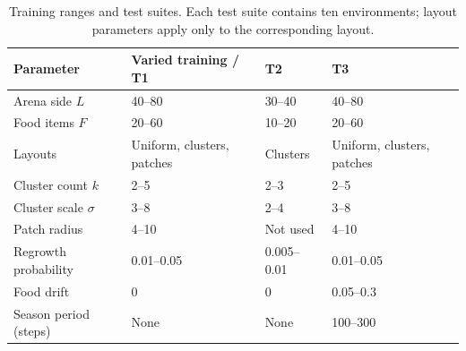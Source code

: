 \begin{table}[tb]
\centering\small
\caption{Training ranges and test suites. Each test suite contains ten environments; layout parameters apply only to the corresponding layout.}\label{tab:env}
\begin{tabularx}{\linewidth}{lYYY}
\toprule
Parameter & Varied training / T1 & T2 & T3\\\midrule
Arena side $L$ & 40--80 & 30--40 & 40--80\\
Food items $F$ & 20--60 & 10--20 & 20--60\\
Layouts & Uniform, clusters, patches & Clusters & Uniform, clusters, patches\\
Cluster count $k$ & 2--5 & 2--3 & 2--5\\
Cluster scale $\sigma$ & 3--8 & 2--4 & 3--8\\
Patch radius & 4--10 & Not used & 4--10\\
Regrowth probability & 0.01--0.05 & 0.005--0.01 & 0.01--0.05\\
Food drift & 0 & 0 & 0.05--0.3\\
Season period (steps) & None & None & 100--300\\
\bottomrule
\end{tabularx}
\end{table}
